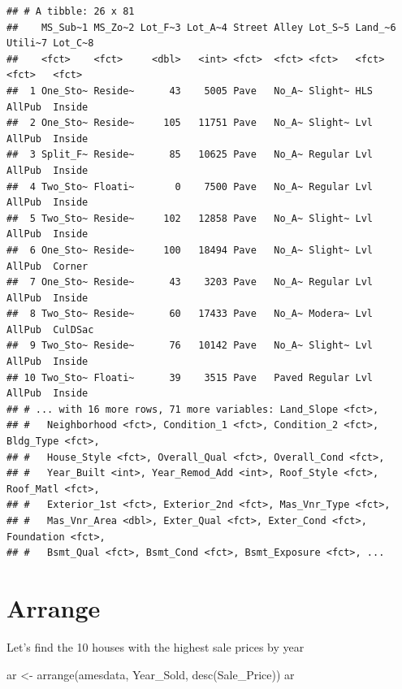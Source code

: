 \documentclass[
]{book}
\newenvironment{Shaded}{\begin{snugshade}}{\end{snugshade}}
\newcommand{\FunctionTok}[1]{\textcolor[rgb]{0.00,0.00,0.00}{#1}}
\newcommand{\NormalTok}[1]{#1}
\newcommand{\OtherTok}[1]{\textcolor[rgb]{0.56,0.35,0.01}{#1}}
\begin{document}
\begin{verbatim}
## # A tibble: 26 x 81
##    MS_Sub~1 MS_Zo~2 Lot_F~3 Lot_A~4 Street Alley Lot_S~5 Land_~6 Utili~7 Lot_C~8
##    <fct>    <fct>     <dbl>   <int> <fct>  <fct> <fct>   <fct>   <fct>   <fct>  
##  1 One_Sto~ Reside~      43    5005 Pave   No_A~ Slight~ HLS     AllPub  Inside 
##  2 One_Sto~ Reside~     105   11751 Pave   No_A~ Slight~ Lvl     AllPub  Inside 
##  3 Split_F~ Reside~      85   10625 Pave   No_A~ Regular Lvl     AllPub  Inside 
##  4 Two_Sto~ Floati~       0    7500 Pave   No_A~ Regular Lvl     AllPub  Inside 
##  5 Two_Sto~ Reside~     102   12858 Pave   No_A~ Slight~ Lvl     AllPub  Inside 
##  6 One_Sto~ Reside~     100   18494 Pave   No_A~ Slight~ Lvl     AllPub  Corner 
##  7 One_Sto~ Reside~      43    3203 Pave   No_A~ Regular Lvl     AllPub  Inside 
##  8 Two_Sto~ Reside~      60   17433 Pave   No_A~ Modera~ Lvl     AllPub  CulDSac
##  9 Two_Sto~ Reside~      76   10142 Pave   No_A~ Slight~ Lvl     AllPub  Inside 
## 10 Two_Sto~ Floati~      39    3515 Pave   Paved Regular Lvl     AllPub  Inside 
## # ... with 16 more rows, 71 more variables: Land_Slope <fct>,
## #   Neighborhood <fct>, Condition_1 <fct>, Condition_2 <fct>, Bldg_Type <fct>,
## #   House_Style <fct>, Overall_Qual <fct>, Overall_Cond <fct>,
## #   Year_Built <int>, Year_Remod_Add <int>, Roof_Style <fct>, Roof_Matl <fct>,
## #   Exterior_1st <fct>, Exterior_2nd <fct>, Mas_Vnr_Type <fct>,
## #   Mas_Vnr_Area <dbl>, Exter_Qual <fct>, Exter_Cond <fct>, Foundation <fct>,
## #   Bsmt_Qual <fct>, Bsmt_Cond <fct>, Bsmt_Exposure <fct>, ...
\end{verbatim}

\hypertarget{arrange}{%
\section{Arrange}\label{arrange}}

Let's find the 10 houses with the highest sale prices by year

\begin{Shaded}
\begin{Highlighting}[]
\NormalTok{ar }\OtherTok{\textless{}{-}} \FunctionTok{arrange}\NormalTok{(amesdata, Year\_Sold, }\FunctionTok{desc}\NormalTok{(Sale\_Price))}
\NormalTok{ar}
\end{Highlighting}
\end{Shaded}
\end{document}

